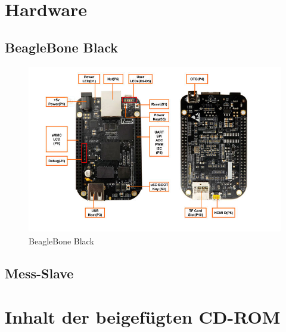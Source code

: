 \begin{appendix}

 {}

\chapter{Hardware}
\label{anhang_Schaltung}

\section{BeagleBone Black}
\begin{figure}[h]
\begin{center}
\includegraphics[width=\textwidth]{img/general/BeagleBeschreibung.jpg}
\caption{BeagleBone Black}
\label{figure_BeschreibungBeagle}
\end{center}
\end{figure}


\section{Mess-Slave}


\newpage



\chapter{Inhalt der beigefügten CD-ROM}
\label{anhang_cd}


\end{appendix}
